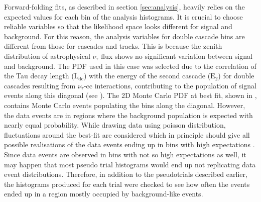 Forward-folding fits, as described in section \ref{sec:analysis}, heavily relies on the expected values for each bin of the analysis histograms. It is crucial to choose reliable variables so that the likelihood space looks different for signal and background. For this reason, the analysis variables for double cascade bins are different from those for cascades and tracks. This is because the zenith distribution of astrophysical $\nu_{\tau}$ flux shows no significant variation between signal and background. The PDF used in this case was selected due to the correlation of the Tau decay length ($\mathrm{L}_{\mathrm{dc}}$) with the energy of the second cascade ($\mathrm{E}_{2}$) for double cascades resulting from $\nu_{\tau}$-cc interactions, contributing to the population of signal events along this diagonal (see ). The 2D Monte Carlo PDF at best fit, shown in , contains Monte Carlo events populating the bins along the diagonal. However, the data events are in regions where the background population is expected with nearly equal probability. While drawing data using poisson distribution, fluctuations around the best-fit are considered which in principle should give all possible realisations of the data events ending up in bins with high expectations . Since data events are observed in bins with not so high expectations as well, it may happen that most pseudo trial histograms would end up not replicating data event distributions. Therefore, in addition to the pseudotrials described earlier, the histograms produced for each trial were checked to see how often the events ended up in a region mostly occupied by background-like events.

